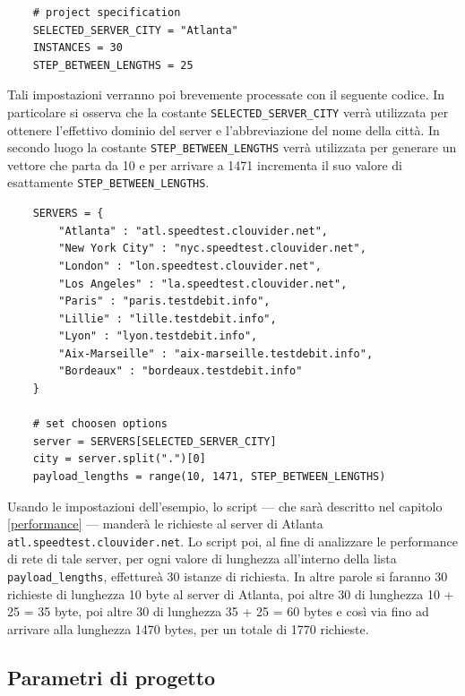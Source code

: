 \begin{lstlisting}
    # project specification
    SELECTED_SERVER_CITY = "Atlanta"
    INSTANCES = 30
    STEP_BETWEEN_LENGTHS = 25
\end{lstlisting}

\noindent Tali impostazioni verranno poi brevemente processate con il seguente codice. In particolare si osserva che la costante \texttt{SELECTED\_SERVER\_CITY} verrà utilizzata per ottenere l'effettivo dominio del server e l'abbreviazione del nome della città. In secondo luogo la costante \texttt{STEP\_BETWEEN\_LENGTHS} verrà utilizzata per generare un vettore che parta da 10 e per arrivare a 1471 incrementa il suo valore di esattamente \texttt{STEP\_BETWEEN\_LENGTHS}.

\begin{lstlisting}
    SERVERS = {
        "Atlanta" : "atl.speedtest.clouvider.net",
        "New York City" : "nyc.speedtest.clouvider.net", 
        "London" : "lon.speedtest.clouvider.net", 
        "Los Angeles" : "la.speedtest.clouvider.net", 
        "Paris" : "paris.testdebit.info", 
        "Lillie" : "lille.testdebit.info", 
        "Lyon" : "lyon.testdebit.info", 
        "Aix-Marseille" : "aix-marseille.testdebit.info", 
        "Bordeaux" : "bordeaux.testdebit.info"
    }

    # set choosen options
    server = SERVERS[SELECTED_SERVER_CITY]
    city = server.split(".")[0]
    payload_lengths = range(10, 1471, STEP_BETWEEN_LENGTHS)
\end{lstlisting}

\noindent Usando le impostazioni dell'esempio, lo script — che sarà descritto nel capitolo\,\ref{performance} — manderà le richieste al server di Atlanta \texttt{atl.speedtest.clouvider.net}. Lo script poi, al fine di analizzare le performance di rete di tale server, per ogni valore di lunghezza all'interno della lista \texttt{payload\_lengths}, effettureà 30 istanze di richiesta. In altre parole si faranno 30 richieste di lunghezza 10 byte al server di Atlanta, poi altre 30 di lunghezza 10 + 25 = 35 byte, poi altre 30 di lunghezza 35 + 25 = 60 bytes e così via fino ad arrivare alla lunghezza 1470 bytes, per un totale di 1770 richieste.



\vspace{15px}\subsection{Parametri di progetto}

